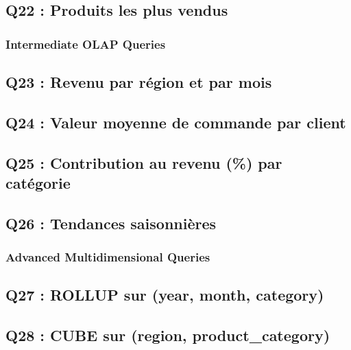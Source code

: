\documentclass{RapportINPTCLOUD}
\begin{document}

\subsection{Q22 : Produits les plus vendus}


\subsubsection*{Intermediate OLAP Queries}

\subsection{Q23 : Revenu par r\'{e}gion et par mois}


\subsection{Q24 : Valeur moyenne de commande par client}


\subsection{Q25 : Contribution au revenu (\%) par cat\'{e}gorie}


\subsection{Q26 : Tendances saisonni\`{e}res}


\subsubsection*{Advanced Multidimensional Queries}

\subsection{Q27 : ROLLUP sur (year, month, category)}


\subsection{Q28 : CUBE sur (region, product\_category)}
\end{document}
